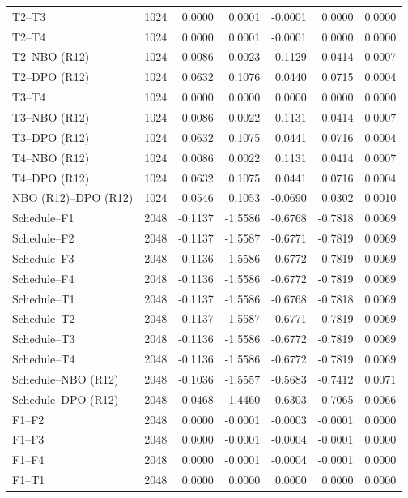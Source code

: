 \begin{longtable}{lrrrrrr}
T2--T3 & 1024 & 0.0000 & 0.0001 & -0.0001 & 0.0000 & 0.0000 \\
T2--T4 & 1024 & 0.0000 & 0.0001 & -0.0001 & 0.0000 & 0.0000 \\
T2--NBO (R12) & 1024 & 0.0086 & 0.0023 & 0.1129 & 0.0414 & 0.0007 \\
T2--DPO (R12) & 1024 & 0.0632 & 0.1076 & 0.0440 & 0.0715 & 0.0004 \\
T3--T4 & 1024 & 0.0000 & 0.0000 & 0.0000 & 0.0000 & 0.0000 \\
T3--NBO (R12) & 1024 & 0.0086 & 0.0022 & 0.1131 & 0.0414 & 0.0007 \\
T3--DPO (R12) & 1024 & 0.0632 & 0.1075 & 0.0441 & 0.0716 & 0.0004 \\
T4--NBO (R12) & 1024 & 0.0086 & 0.0022 & 0.1131 & 0.0414 & 0.0007 \\
T4--DPO (R12) & 1024 & 0.0632 & 0.1075 & 0.0441 & 0.0716 & 0.0004 \\
NBO (R12)--DPO (R12) & 1024 & 0.0546 & 0.1053 & -0.0690 & 0.0302 & 0.0010 \\
Schedule--F1 & 2048 & -0.1137 & -1.5586 & -0.6768 & -0.7818 & 0.0069 \\
Schedule--F2 & 2048 & -0.1137 & -1.5587 & -0.6771 & -0.7819 & 0.0069 \\
Schedule--F3 & 2048 & -0.1136 & -1.5586 & -0.6772 & -0.7819 & 0.0069 \\
Schedule--F4 & 2048 & -0.1136 & -1.5586 & -0.6772 & -0.7819 & 0.0069 \\
Schedule--T1 & 2048 & -0.1137 & -1.5586 & -0.6768 & -0.7818 & 0.0069 \\
Schedule--T2 & 2048 & -0.1137 & -1.5587 & -0.6771 & -0.7819 & 0.0069 \\
Schedule--T3 & 2048 & -0.1136 & -1.5586 & -0.6772 & -0.7819 & 0.0069 \\
Schedule--T4 & 2048 & -0.1136 & -1.5586 & -0.6772 & -0.7819 & 0.0069 \\
Schedule--NBO (R12) & 2048 & -0.1036 & -1.5557 & -0.5683 & -0.7412 & 0.0071 \\
Schedule--DPO (R12) & 2048 & -0.0468 & -1.4460 & -0.6303 & -0.7065 & 0.0066 \\
F1--F2 & 2048 & 0.0000 & -0.0001 & -0.0003 & -0.0001 & 0.0000 \\
F1--F3 & 2048 & 0.0000 & -0.0001 & -0.0004 & -0.0001 & 0.0000 \\
F1--F4 & 2048 & 0.0000 & -0.0001 & -0.0004 & -0.0001 & 0.0000 \\
F1--T1 & 2048 & 0.0000 & 0.0000 & 0.0000 & 0.0000 & 0.0000 \\

\end{longtable}
